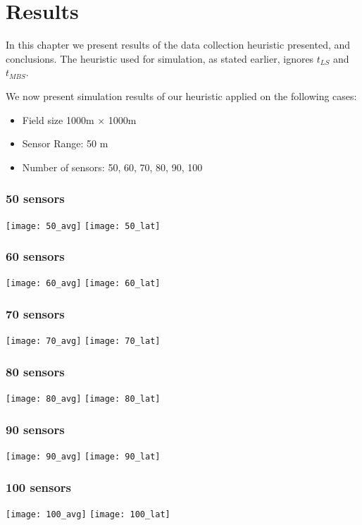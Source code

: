 \chapter{Results}

In this chapter we present results of the data collection heuristic presented, and conclusions. The heuristic used for simulation, as stated earlier, ignores $t_{LS}$ and $t_{MBS}$.

We now present simulation results of our heuristic applied on the following cases:
\begin{itemize}
\item Field size 1000m $\times$ 1000m
\item Sensor Range: 50 m
\item Number of sensors: 50, 60, 70, 80, 90, 100
\end{itemize}

\subsection{50 sensors}
\texttt{[image: 50\_avg]}
\texttt{[image: 50\_lat]}

\subsection{60 sensors}
\texttt{[image: 60\_avg]}
\texttt{[image: 60\_lat]}

\subsection{70 sensors}
\texttt{[image: 70\_avg]}
\texttt{[image: 70\_lat]}

\subsection{80 sensors}
\texttt{[image: 80\_avg]}
\texttt{[image: 80\_lat]}

\subsection{90 sensors}
\texttt{[image: 90\_avg]}
\texttt{[image: 90\_lat]}

\subsection{100 sensors}
\texttt{[image: 100\_avg]}
\texttt{[image: 100\_lat]}